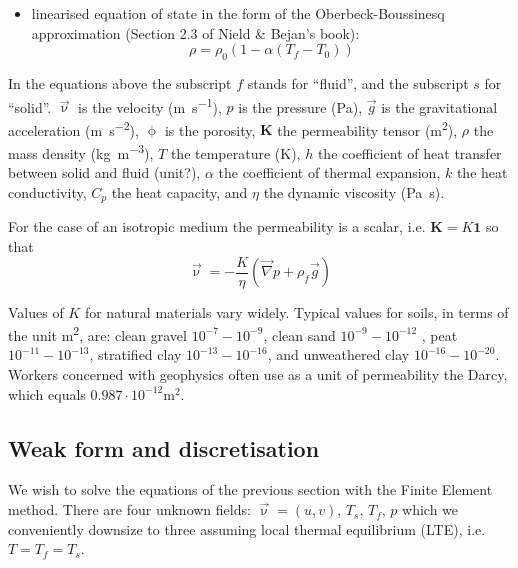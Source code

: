\begin{itemize}
\item linearised equation of state in the form of the Oberbeck-Boussinesq approximation (Section 2.3 of Nield \& Bejan's book):
\[
\rho=\rho_0(1-\alpha(T_f-T_0))
\]
\end{itemize}

\noindent In the equations above the subscript $f$ stands for ``fluid'', and the subscript $s$ for ``solid''. $\vec{\upnu}$ is the velocity (\si{\metre\per\second}), $p$ is the pressure (\si{\pascal}), $\vec{g}$ is the gravitational acceleration (\si{\metre\per\square\second}), $\upphi$ is the porosity, ${\bm K}$ the permeability tensor (\si{\square\metre}), $\rho$ the mass density (\si{\kg\per\cubic\metre}), $T$ the temperature (\si{\kelvin}), $h$ the coefficient of heat transfer between solid and fluid (unit?), $\alpha$ the coefficient of thermal expansion, $k$ the heat conductivity, $C_p$ the heat capacity, and $\eta$ the dynamic viscosity (\si{\pascal\second}). 

For the case of an isotropic medium the permeability is a scalar, i.e. ${\bm K}=K {\bm 1}$ so that 
\begin{equation}
\vec{\upnu} = -\frac{K}{\eta} (\vec\nabla p + \rho_f \vec{g})
\label{eq:darcy2}
\end{equation}

Values of $K$ for natural materials vary widely. Typical values for soils, in terms of the unit \si{\square\metre}, 
are: clean gravel $10^{-7}-10^{-9}$, 
clean sand $10^{-9}-10^{-12}$ , peat $10^{-11}-10^{-13}$,
stratified clay $10^{-13}-10^{-16}$, 
and unweathered clay $10^{-16}-10^{-20}$. 
Workers concerned with geophysics often use as a unit of permeability the Darcy, which equals $0.987\cdot 10^{-12}\si{\square\metre}$.



\subsection{Weak form and discretisation}

We wish to solve the equations of the previous section 
with the Finite Element method. 
There are four unknown fields: $\vec{\upnu}=(u,v)$, $T_s$, $T_f$, $p$
which we conveniently downsize to three assuming local thermal equilibrium (LTE), i.e. $T=T_f=T_s$.

